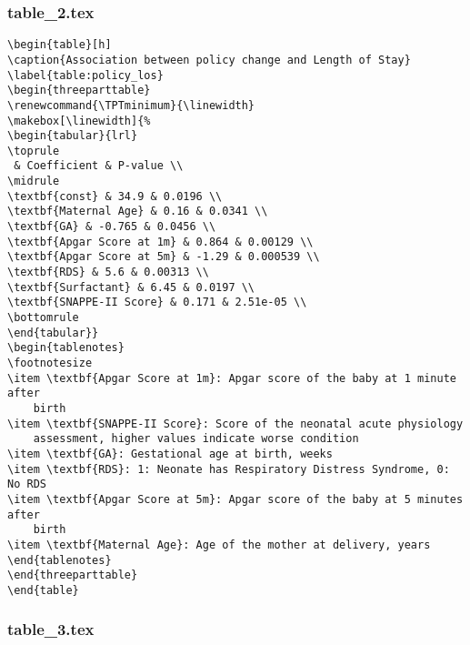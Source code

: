 \documentclass[11pt]{article}
\begin{document}
\subsubsection*{table\_2.tex}

\begin{Verbatim}[tabsize=4]
\begin{table}[h]
\caption{Association between policy change and Length of Stay}
\label{table:policy_los}
\begin{threeparttable}
\renewcommand{\TPTminimum}{\linewidth}
\makebox[\linewidth]{%
\begin{tabular}{lrl}
\toprule
 & Coefficient & P-value \\
\midrule
\textbf{const} & 34.9 & 0.0196 \\
\textbf{Maternal Age} & 0.16 & 0.0341 \\
\textbf{GA} & -0.765 & 0.0456 \\
\textbf{Apgar Score at 1m} & 0.864 & 0.00129 \\
\textbf{Apgar Score at 5m} & -1.29 & 0.000539 \\
\textbf{RDS} & 5.6 & 0.00313 \\
\textbf{Surfactant} & 6.45 & 0.0197 \\
\textbf{SNAPPE-II Score} & 0.171 & 2.51e-05 \\
\bottomrule
\end{tabular}}
\begin{tablenotes}
\footnotesize
\item \textbf{Apgar Score at 1m}: Apgar score of the baby at 1 minute after
	birth
\item \textbf{SNAPPE-II Score}: Score of the neonatal acute physiology
	assessment, higher values indicate worse condition
\item \textbf{GA}: Gestational age at birth, weeks
\item \textbf{RDS}: 1: Neonate has Respiratory Distress Syndrome, 0: No RDS
\item \textbf{Apgar Score at 5m}: Apgar score of the baby at 5 minutes after
	birth
\item \textbf{Maternal Age}: Age of the mother at delivery, years
\end{tablenotes}
\end{threeparttable}
\end{table}

\end{Verbatim}

\subsubsection*{table\_3.tex}
\end{document}
